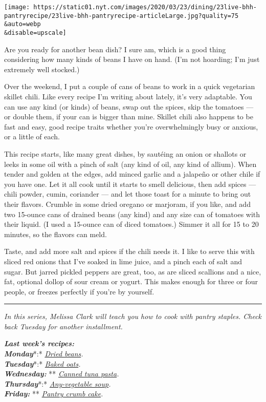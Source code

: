 \texttt{[image: https://static01.nyt.com/images/2020/03/23/dining/23live-bhh-pantryrecipe/23live-bhh-pantryrecipe-articleLarge.jpg?quality=75\\\&auto=webp\\\&disable=upscale]}

Are you ready for another bean dish? I sure am, which is a good thing
considering how many kinds of beans I have on hand. (I'm not hoarding;
I'm just extremely well stocked.)

Over the weekend, I put a couple of cans of beans to work in a quick
vegetarian skillet chili. Like every recipe I'm writing about lately,
it's very adaptable. You can use any kind (or kinds) of beans, swap out
the spices, skip the tomatoes --- or double them, if your can is bigger
than mine. Skillet chili also happens to be fast and easy, good recipe
traits whether you're overwhelmingly busy or anxious, or a little of
each.

This recipe starts, like many great dishes, by sautéing an onion or
shallots or leeks in some oil with a pinch of salt (any kind of oil, any
kind of allium). When tender and golden at the edges, add minced garlic
and a jalapeño or other chile if you have one. Let it all cook until it
starts to smell delicious, then add spices --- chili powder, cumin,
coriander --- and let those toast for a minute to bring out their
flavors. Crumble in some dried oregano or marjoram, if you like, and add
two 15-ounce cans of drained beans (any kind) and any size can of
tomatoes with their liquid. (I used a 15-ounce can of diced tomatoes.)
Simmer it all for 15 to 20 minutes, so the flavors can meld.

Taste, and add more salt and spices if the chili needs it. I like to
serve this with sliced red onions that I've soaked in lime juice, and a
pinch each of salt and sugar. But jarred pickled peppers are great, too,
as are sliced scallions and a nice, fat, optional dollop of sour cream
or yogurt. This makes enough for three or four people, or freezes
perfectly if you're by yourself.

\begin{center}\rule{0.5\linewidth}{\linethickness}\end{center}

\emph{In this series, Melissa Clark will teach you how to cook with
pantry staples. Check back Tuesday for another installment.}

\emph{\textbf{Last week's recipes:}}\\
\emph{\textbf{Monday}}*:*
\href{https://cooking.nytimes.com/recipes/1020947-big-pot-of-beans}{\emph{Dried
beans}}\emph{.}\\
\emph{\textbf{Tuesday}}*:*
\href{https://cooking.nytimes.com/recipes/1020948-baked-steel-cut-oats-with-nut-butter}{\emph{Baked
oats}}\emph{.}\\
\emph{\textbf{Wednesday:}} **
\href{https://cooking.nytimes.com/recipes/1020949-pasta-with-tuna-capers-and-scallions}{\emph{Canned
tuna pasta}}\emph{.}\\
\emph{\textbf{Thursday}}*:*
\href{https://cooking.nytimes.com/recipes/1020950-any-vegetable-soup}{\emph{Any-vegetable
soup}}\emph{.}\\
\emph{\textbf{Friday:}} **
\href{https://cooking.nytimes.com/recipes/1020946-pantry-crumb-cake}{\emph{Pantry
crumb cake}}\emph{.}

